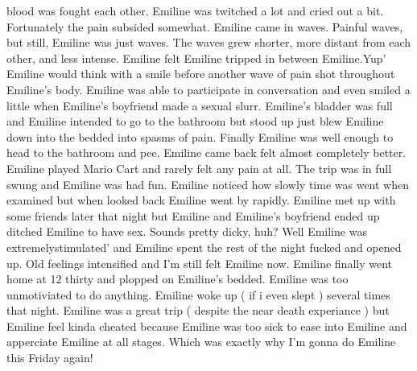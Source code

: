 \documentclass[12pt]{book}
\begin{document}
blood was fought each other. Emiline was twitched a lot and cried out a bit. Fortunately the pain subsided somewhat. Emiline came in waves. Painful waves, but still, Emiline was just waves. The waves grew shorter, more distant from each other, and less intense. Emiline felt Emiline tripped in between Emiline.Yup' Emiline would think with a smile before another wave of pain shot throughout Emiline's body. Emiline was able to participate in conversation and even smiled a little when Emiline's boyfriend made a sexual slurr. Emiline's bladder was full and Emiline intended to go to the bathroom but stood up just blew Emiline down into the bedded into spasms of pain. Finally Emiline was well enough to head to the bathroom and pee. Emiline came back felt almost completely better. Emiline played Mario Cart and rarely felt any pain at all. The trip was in full swung and Emiline was had fun. Emiline noticed how slowly time was went when examined but when looked back Emiline went by rapidly. Emiline met up with some friends later that night but Emiline and Emiline's boyfriend ended up ditched Emiline to have sex. Sounds pretty dicky, huh? Well Emiline was extremelystimulated' and Emiline spent the rest of the night fucked and opened up. Old feelings intensified and I'm still felt Emiline now. Emiline finally went home at 12 thirty and plopped on Emiline's bedded. Emiline was too unmotiviated to do anything. Emiline woke up ( if i even slept ) several times that night. Emiline was a great trip ( despite the near death experiance ) but Emiline feel kinda cheated because Emiline was too sick to ease into Emiline and apperciate Emiline at all stages. Which was exactly why I'm gonna do Emiline this Friday again!
\end{document}
